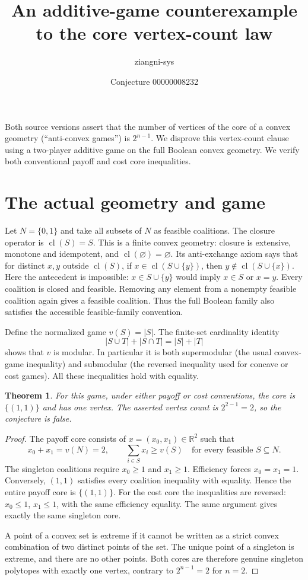 \documentclass[11pt]{article}
\title{An additive-game counterexample to the core vertex-count law}
\author{ziangni-sys}
\date{Conjecture 00000008232}
\newtheorem{theorem}{Theorem}
\begin{document}
\sloppy
\maketitle
\noindent Both source versions assert that the number of vertices of the core
of a convex geometry (``anti-convex games'') is $2^{n-1}$. We disprove this
vertex-count clause using a two-player additive game on the full Boolean
convex geometry. We verify both conventional payoff and cost core inequalities.

\section*{The actual geometry and game}
Let $N=\{0,1\}$ and take all subsets of $N$ as feasible coalitions.
The closure operator is $\operatorname{cl}(S)=S$. This is a finite convex
geometry: closure is extensive, monotone and idempotent, and
$\operatorname{cl}(\varnothing)=\varnothing$. Its anti-exchange axiom says
that for distinct $x,y$ outside $\operatorname{cl}(S)$, if
$x\in\operatorname{cl}(S\cup\{y\})$, then
$y\notin\operatorname{cl}(S\cup\{x\})$. Here the antecedent is impossible:
$x\in S\cup\{y\}$ would imply $x\in S$ or $x=y$.
Every coalition is closed and feasible. Removing any element from a
nonempty feasible coalition again gives a feasible coalition. Thus the full
Boolean family also satisfies the accessible feasible-family convention.

Define the normalized game $v(S)=|S|$. The finite-set cardinality identity
\[
 |S\cup T|+|S\cap T|=|S|+|T|
\]
shows that $v$ is modular. In particular it is both supermodular (the usual
convex-game inequality) and submodular (the reversed inequality used for
concave or cost games). All these inequalities hold with equality.

\begin{theorem}
For this game, under either payoff or cost conventions, the core is
$\{(1,1)\}$ and has one vertex. The asserted vertex count is
$2^{2-1}=2$, so the conjecture is false.
\end{theorem}
\begin{proof}
The payoff core consists of $x=(x_0,x_1)\in\mathbb R^2$ such that
\[
 x_0+x_1=v(N)=2,\qquad \sum_{i\in S}x_i\ge v(S)
 \quad\text{for every feasible }S\subseteq N.
\]
The singleton coalitions require $x_0\ge1$ and $x_1\ge1$.
Efficiency forces $x_0=x_1=1$. Conversely, $(1,1)$ satisfies every coalition
inequality with equality. Hence the entire payoff core is $\{(1,1)\}$.
For the cost core the inequalities are reversed: $x_0\le1$, $x_1\le1$,
with the same efficiency equality. The same argument gives exactly the
same singleton core.

A point of a convex set is extreme if it cannot be written as a strict
convex combination of two distinct points of the set. The unique point of
a singleton is extreme, and there are no other points. Both cores are
therefore genuine singleton polytopes with exactly one vertex, contrary to
$2^{n-1}=2$ for $n=2$.
\end{proof}
\newpage
\end{document}
